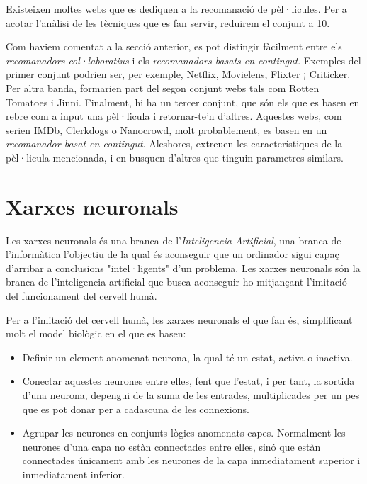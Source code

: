 Existeixen moltes webs que es dediquen a la recomanació de pèl·licules. Per a acotar l'anàlisi de les tècniques que es fan servir, reduirem el conjunt a 10.\cite{top-ten-film-recommenders}

Com haviem comentat a la secció anterior, es pot distingir fàcilment entre els \emph{recomanadors col·laboratius} i els \emph{recomanadors basats en contingut}. Exemples del primer conjunt podrien ser, per exemple, Netflix, Movielens, Flixter ¡ Criticker. Per altra banda, formarien part del segon conjunt webs tals com Rotten Tomatoes i Jinni. Finalment, hi ha un tercer conjunt, que són els que es basen en rebre com a input una pèl·licula i retornar-te'n d'altres. Aquestes webs, com serien IMDb, Clerkdogs o Nanocrowd, molt probablement, es basen en un \emph{recomanador basat en contingut}. Aleshores, extreuen les característiques de la pèl·licula mencionada, i en busquen d'altres que tinguin parametres similars.

\section{Xarxes neuronals}

Les xarxes neuronals és una branca de l'\emph{Inteligencia Artificial}, una branca de l'informàtica l'objectiu de la qual és aconseguir que un ordinador sigui capaç d'arribar a conclusions "intel·ligents" d'un problema. Les xarxes neuronals són la branca de l'inteligencia artificial que busca aconseguir-ho mitjançant l'imitació del funcionament del cervell humà.

Per a l'imitació del cervell humà, les xarxes neuronals el que fan és, simplificant molt el model biològic en el que es basen:

\begin{itemize}
	\item Definir un element anomenat neurona, la qual té un estat, activa o inactiva.
	\item Conectar aquestes neurones entre elles, fent que l'estat, i per tant, la sortida d'una neurona, depengui de la suma de les entrades, multiplicades per un pes que es pot donar per a cadascuna de les connexions.
	\item Agrupar les neurones en conjunts lògics anomenats capes. Normalment les neurones d'una capa no estàn connectades entre elles, sinó que estàn connectades únicament amb les neurones de la capa inmediatament superior i inmediatament inferior.
\end{itemize}

